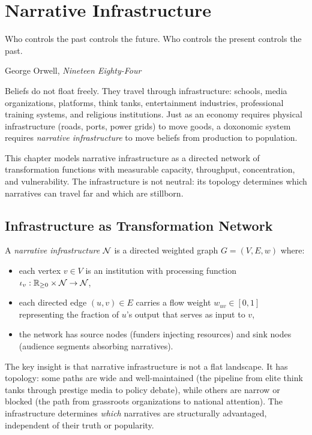 \chapter{Narrative Infrastructure}
\label{ch:narrative-infrastructure}

\epigraph{Who controls the past controls the future. Who controls the present controls the past.}{George Orwell, \textit{Nineteen Eighty-Four}}

\noindent
Beliefs do not float freely.
They travel through infrastructure: schools, media organizations, platforms, think tanks, entertainment industries, professional training systems, and religious institutions.
Just as an economy requires physical infrastructure (roads, ports, power grids) to move goods, a doxonomic system requires \emph{narrative infrastructure} to move beliefs from production to population.

This chapter models narrative infrastructure as a directed network of transformation functions with measurable capacity, throughput, concentration, and vulnerability.
The infrastructure is not neutral: its topology determines which narratives can travel far and which are stillborn.


\section{Infrastructure as Transformation Network}
\label{sec:ch7-transformation}

\begin{definition}
\label{def:narrative-infrastructure}
A \emph{narrative infrastructure} $\mathcal{N}$ is a directed weighted graph $G = (V, E, w)$ where:
\begin{itemize}[nosep]
  \item each vertex $v \in V$ is an institution with processing function $\iota_v: \mathbb{R}_{\geq 0} \times \mathcal{N} \to \mathcal{N}$,
  \item each directed edge $(u, v) \in E$ carries a flow weight $w_{uv} \in [0,1]$ representing the fraction of $u$'s output that serves as input to $v$,
  \item the network has source nodes (funders injecting resources) and sink nodes (audience segments absorbing narratives).
\end{itemize}
\end{definition}

The key insight is that narrative infrastructure is not a flat landscape.
It has topology: some paths are wide and well-maintained (the pipeline from elite think tanks through prestige media to policy debate), while others are narrow or blocked (the path from grassroots organizations to national attention).
The infrastructure determines \emph{which} narratives are structurally advantaged, independent of their truth or popularity.

